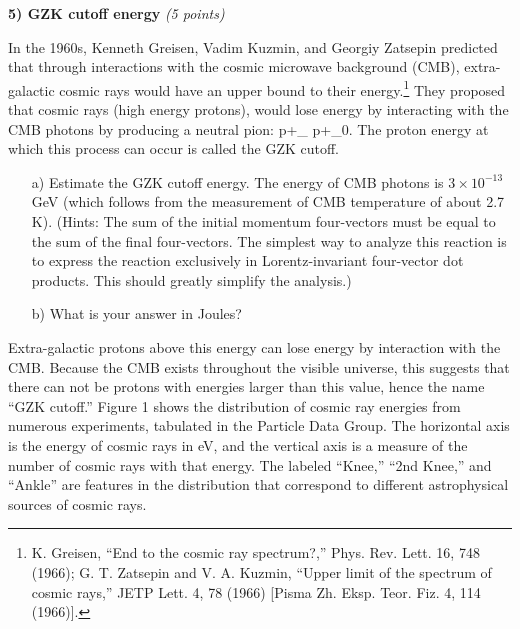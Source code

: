 \vspace*{0.25in}

\textbf{5)  GZK cutoff energy} \hfill \textit{(5 points)}

In the 1960s, Kenneth Greisen, Vadim Kuzmin, and Georgiy Zatsepin predicted that through interactions with the cosmic microwave background (CMB), extra-galactic cosmic rays would have an upper bound to their energy.\footnote{K. Greisen, “End to the cosmic ray spectrum?,” Phys. Rev. Lett. 16, 748 (1966); G. T. Zatsepin and V. A. Kuzmin, “Upper limit of the spectrum of cosmic rays,” JETP Lett. 4, 78 (1966) [Pisma Zh. Eksp. Teor. Fiz. 4, 114 (1966)].}
They proposed that cosmic rays (high energy protons), would lose energy by interacting with the CMB photons by producing a neutral pion:
\be
p+\gamma_{} \rightarrow p+\pi_0.
\ee
The proton energy at which this process can occur is called the GZK cutoff. 

\begin{itemize}
\item[a)]{
Estimate the GZK cutoff energy.
The energy of CMB photons is $3 \times 10^{-13}$ GeV (which follows from the measurement of CMB temperature of about 2.7 K).
(Hints: The sum of the initial momentum four-vectors must be equal to the sum of the final four-vectors. 
The simplest way to analyze this reaction is to express the reaction exclusively in Lorentz-invariant four-vector dot products. 
This should greatly simplify the analysis.)
}
\item[b)]{What is your answer in Joules?}
\end{itemize}

Extra-galactic protons above this energy can lose energy by interaction with the CMB. 
Because the CMB exists throughout the visible universe, this suggests that there can not be protons with energies larger than this value, hence the name ``GZK cutoff.''
Figure 1 shows the distribution of cosmic ray energies from numerous experiments, tabulated in the Particle Data Group. 
The horizontal axis is the energy of cosmic rays in eV, and the vertical axis is a measure of the number of cosmic rays with that energy. 
The labeled ``Knee,'' ``2nd Knee,'' and ``Ankle'' are features in the distribution that correspond to different astrophysical sources of cosmic rays.

